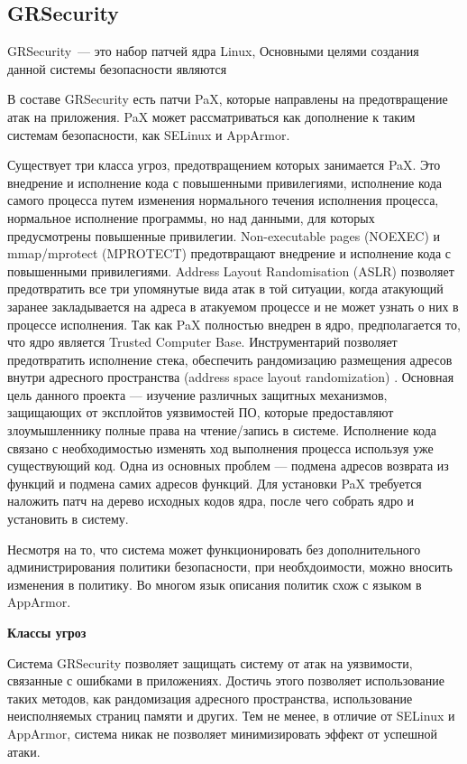 \subsection{GRSecurity} 
 
GRSecurity~--- это набор патчей ядра Linux, 
Основными целями создания данной системы 
безопасности являются 

В составе GRSecurity есть патчи PaX, которые 
направлены на предотвращение атак на приложения. 
PaX может рассматриваться как дополнение к 
таким системам безопасности, как SELinux и 
AppArmor.
 
Существует три класса угроз, предотвращением которых 
занимается PaX. Это внедрение и исполнение кода с 
повышенными привилегиями, исполнение кода самого 
процесса путем изменения нормального течения 
исполнения процесса, нормальное исполнение программы, 
но над данными, для которых предусмотрены повышенные 
привилегии. Non-executable pages (NOEXEC) и mmap/mprotect 
(MPROTECT) предотвращают внедрение и исполнение 
кода с повышенными привилегиями. 
Address Layout Randomisation (ASLR) 
позволяет предотвратить все три упомянутые вида атак в той 
ситуации, когда атакующий заранее закладывается на 
адреса в атакуемом процессе и не может узнать о них 
в процессе исполнения. Так как PaX полностью внедрен 
в ядро, предполагается то, что ядро является Trusted 
Computer Base. Инструментарий позволяет предотвратить 
исполнение стека, обеспечить рандомизацию 
размещения адресов внутри адресного пространства 
(address space layout randomization) . 
Основная цель данного проекта — изучение различных защитных 
механизмов, защищающих от эксплойтов уязвимостей ПО, которые 
предоставляют злоумышленнику полные права на чтение/запись в 
системе. Исполнение кода связано с необходимостью изменять 
ход выполнения процесса используя уже существующий код. Одна 
из основных проблем — подмена адресов возврата из функций и 
подмена самих адресов функций. Для установки PaX требуется 
наложить патч на дерево исходных кодов ядра, после чего собрать 
ядро и установить в систему. 

Несмотря на то, что система может функционировать 
без дополнительного администрирования политики 
безопасности, при необхдоимости, можно вносить 
изменения в политику. Во многом язык описания 
политик схож с языком в AppArmor. 

\bigskip
{\bfseries Классы угроз} 

Система GRSecurity позволяет защищать систему от 
атак на уязвимости, связанные с ошибками в приложениях. 
Достичь этого позволяет использование таких методов, как 
рандомизация адресного пространства, использование 
неисполняемых страниц памяти и других. Тем не менее, 
в отличие от SELinux и AppArmor, система никак 
не позволяет минимизировать эффект от успешной атаки.

